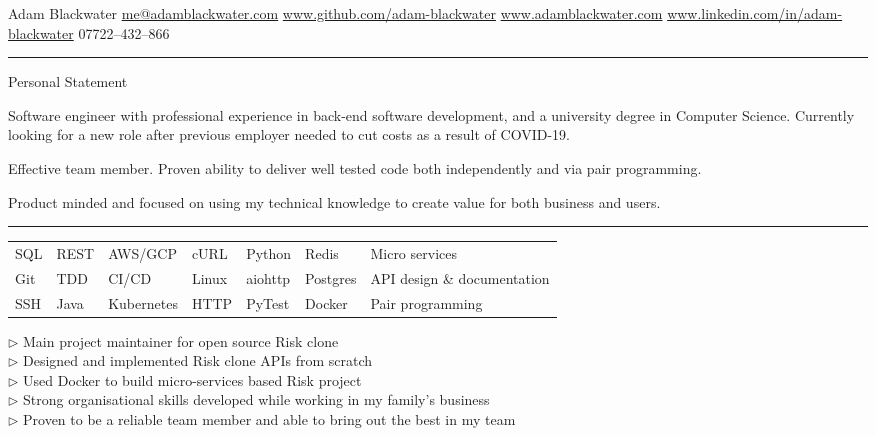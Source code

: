 \documentclass[12pt,twoside]{article}
\begin{document}
\topheading
    {Adam Blackwater}
    {\url{me@adamblackwater.com} \hspace{0.15em}}
    {\url{www.github.com/adam-blackwater}}
    {\url{www.adamblackwater.com}}
    {\url{www.linkedin.com/in/adam-blackwater}}
    {07722--432--866}

\vspace{0.5em}
\hrule
\vspace{0.5em}

\statement
    {Personal Statement}
    {
        Software engineer with professional experience in back-end software
        development, and a university degree in Computer Science. Currently
        looking for a new role after previous employer needed to cut costs as a
        result of COVID-19.

        \hspace{1.5em}Effective team member. Proven ability to deliver well
        tested code both independently and via pair programming. 

        \hspace{1.5em}Product minded and focused on using my technical knowledge 
        to create value for both business and users.
    }

\vspace{0.5em}
\hrule
\vspace{0.5em}

\begin{center}
    \begin{tabular}{l l l l l l l}
        SQL & REST & AWS/GCP & cURL & Python & Redis & Micro services \\
        Git & TDD & CI/CD & Linux & aiohttp & Postgres & API design \& documentation \\
        SSH & Java & Kubernetes & HTTP & PyTest& Docker & Pair programming
    \end{tabular}
\end{center}
    
\parbox{35em}{
    $\triangleright$ Main project maintainer for open source Risk clone \\
    $\triangleright$ Designed and implemented Risk clone APIs from scratch \\
    $\triangleright$ Used Docker to build micro-services based Risk project \\
    $\triangleright$ Strong organisational skills developed while working in my family's business \\
    $\triangleright$ Proven to be a reliable team member and able to bring out the best in my team
    }
\end{document}
